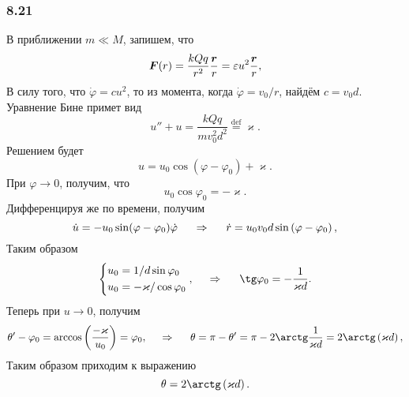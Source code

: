 

\subsubsection*{8.21}

В приближении $m \ll M$, запишем, что
$$
    \mbox{\boldmath $F$}(r) = \frac{kQq}{r^2} \frac{\mbox{\boldmath $r$}}{r} = \varepsilon u^2 \frac{\mbox{\boldmath $r$}}{r},
$$
В силу того, что $\dot{\varphi} = cu^2$, то из момента, когда $\dot{\varphi} = v_0 / r$, найдём $c=v_0 d$.
Уравнение Бине примет вид
\begin{equation}
    u'' + u = \frac{kQq}{mv_0^2 d^2} 
    \overset{\mathrm{def}}{=} \varkappa.
\end{equation}
Решением будет
\begin{equation}
    u = u_0 \cos \left(\varphi - \varphi_0\right) + \varkappa.
\end{equation}
При $\varphi \to 0$, получим, что
$$
    u_0 \cos \varphi_0 = -\varkappa.
$$
Дифференцируя же по времени, получим
$$
    \dot{u} = - u_0 \sin (\varphi - \varphi_0) \dot{\varphi}
    \hspace{0.5cm} \Rightarrow \hspace{0.5cm} 
    \dot{r} = u_0 v_0 d \sin \left(\varphi - \varphi_0\right),
$$
Таким образом
$$
    \left\{\begin{aligned}
        u_0 &= 1 / d \sin \varphi_0 \\
        u_0 &= - \varkappa / \cos \varphi_0
    \end{aligned}\right. ,
    \hspace{0.5cm} \Rightarrow \hspace{0.5cm} 
    \tg \varphi_0 = - \frac{1}{\varkappa d}.
$$
Теперь при $u \to 0$, получим
$$
    \theta' - \varphi_0 = \arccos \left(\frac{-\varkappa}{u_0} \right) = \varphi_0,
    \hspace{0.5cm} \Rightarrow \hspace{0.5cm} 
    \theta = \pi - \theta' = \pi - 2 \arctg \frac{1}{\varkappa d} 
    =
    2 \arctg \left(\varkappa d\right),
$$
Таким образом приходим к выражению
\begin{equation}
    \theta = 2 \arctg \left(\varkappa d\right).
\end{equation}